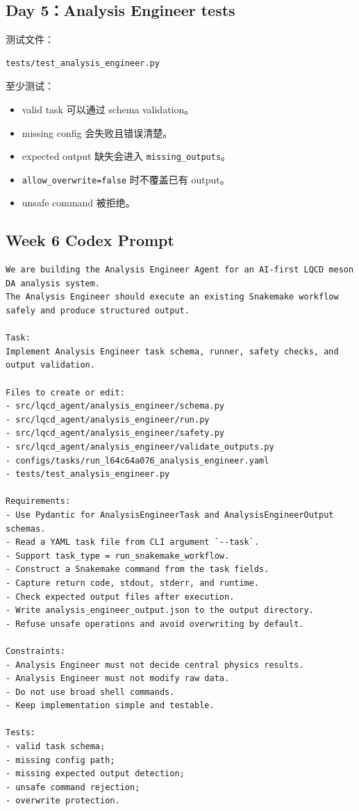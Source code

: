 \documentclass[11pt,a4paper,fontset=none]{ctexart}
\begin{document}
\subsection{Day 5：Analysis Engineer tests}

测试文件：

\begin{lstlisting}
tests/test_analysis_engineer.py
\end{lstlisting}

至少测试：

\begin{itemize}[leftmargin=2em]
  \item valid task 可以通过 schema validation。
  \item missing config 会失败且错误清楚。
  \item expected output 缺失会进入 \texttt{missing\_outputs}。
  \item \texttt{allow\_overwrite=false} 时不覆盖已有 output。
  \item unsafe command 被拒绝。
\end{itemize}

\subsection{Week 6 Codex Prompt}

\begin{lstlisting}
We are building the Analysis Engineer Agent for an AI-first LQCD meson DA analysis system.
The Analysis Engineer should execute an existing Snakemake workflow safely and produce structured output.

Task:
Implement Analysis Engineer task schema, runner, safety checks, and output validation.

Files to create or edit:
- src/lqcd_agent/analysis_engineer/schema.py
- src/lqcd_agent/analysis_engineer/run.py
- src/lqcd_agent/analysis_engineer/safety.py
- src/lqcd_agent/analysis_engineer/validate_outputs.py
- configs/tasks/run_l64c64a076_analysis_engineer.yaml
- tests/test_analysis_engineer.py

Requirements:
- Use Pydantic for AnalysisEngineerTask and AnalysisEngineerOutput schemas.
- Read a YAML task file from CLI argument `--task`.
- Support task_type = run_snakemake_workflow.
- Construct a Snakemake command from the task fields.
- Capture return code, stdout, stderr, and runtime.
- Check expected output files after execution.
- Write analysis_engineer_output.json to the output directory.
- Refuse unsafe operations and avoid overwriting by default.

Constraints:
- Analysis Engineer must not decide central physics results.
- Analysis Engineer must not modify raw data.
- Do not use broad shell commands.
- Keep implementation simple and testable.

Tests:
- valid task schema;
- missing config path;
- missing expected output detection;
- unsafe command rejection;
- overwrite protection.
\end{lstlisting}
\end{document}

